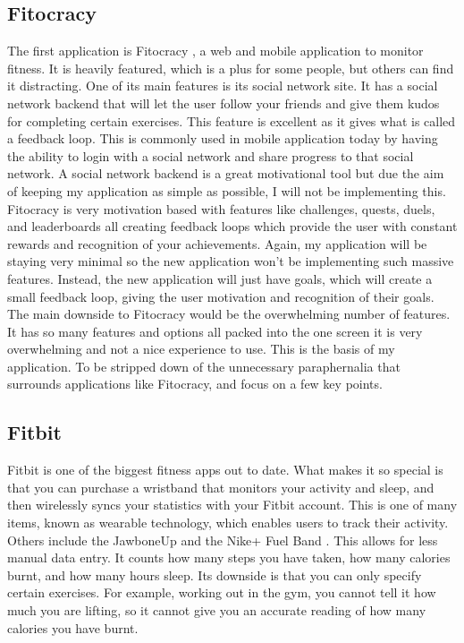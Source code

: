 \subsection{Fitocracy}
The first application is Fitocracy \citep{fitocracy:2007}, a web and mobile application to monitor fitness. It is heavily featured, which is a plus for some people, but others can find it distracting. One of its main features is its social network site. It has a social network backend that will let the user follow your friends and give them kudos for completing certain exercises. This feature is excellent as it gives what is called a feedback loop. This is commonly used in mobile application today by having the ability to login with a social network and share progress to that social network. A social network backend is a great motivational tool but due the aim of keeping my application as simple as possible, I will not be implementing this. Fitocracy is very motivation based with features like challenges, quests, duels, and leaderboards all creating feedback loops which provide the user with constant rewards and recognition of your achievements. Again, my application will be staying very minimal so the new application won't be implementing such massive features. Instead, the new application will just have goals, which will create a small feedback loop, giving the user motivation and recognition of their goals. The main downside to Fitocracy would be the overwhelming number of features. It has so many features and options all packed into the one screen it is very overwhelming and not a nice experience to use. This is the basis of my application. To be stripped down of the unnecessary paraphernalia that surrounds applications like Fitocracy, and focus on a few key points.


\subsection{Fitbit}
Fitbit is one of the biggest fitness apps out to date. What makes it so special is that you can purchase a wristband that monitors your activity and sleep, and then wirelessly syncs your statistics with your Fitbit account. This is one of many items, known as wearable technology, which enables users to track their activity. Others include the JawboneUp \citep{jawbone:2011} and the Nike+ Fuel Band \citep{nikefuelband:2012}. This allows for less manual data entry. It counts how many steps you have taken, how many calories burnt, and how many hours sleep. Its downside is that you can only specify certain exercises. For example, working out in the gym, you cannot tell it how much you are lifting, so it cannot give you an accurate reading of how many calories you have burnt.\\

